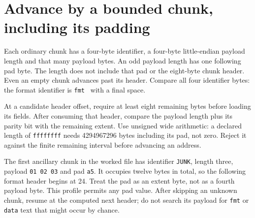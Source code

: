 \section{Advance by a bounded chunk, including its padding}
Each ordinary chunk has a four-byte identifier, a four-byte little-endian payload
length and that many payload bytes. An odd payload length has one following pad byte.
The length does not include that pad or the eight-byte chunk header. Even an empty chunk advances past its header. Compare all four
identifier bytes: the format identifier is \texttt{fmt\ } with a final space.

At a candidate header offset, require at least eight remaining bytes before loading
its fields. After consuming that header, compare the payload length plus its parity
bit with the remaining extent. Use unsigned wide arithmetic: a declared length of
\texttt{ffffffff} needs 4294967296 bytes including its pad, not zero. Reject it against
the finite remaining interval before advancing an address.

The first ancillary chunk in the worked file has identifier \texttt{JUNK}, length
three, payload \texttt{01 02 03} and pad \texttt{a5}. It occupies twelve bytes in total,
so the following format header begins at 24. Treat the pad as an extent byte, not as
a fourth payload byte. This profile permits any pad value. After skipping an unknown
chunk, resume at the computed next header; do not search its payload for \texttt{fmt}
or \texttt{data} text that might occur by chance.
